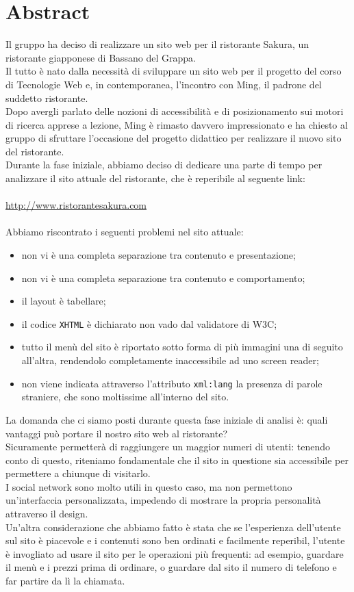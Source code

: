 \documentclass[../relazione.tex]{subfiles}
\begin{document}
\section{Abstract}
		Il gruppo ha deciso di realizzare un sito web per il ristorante Sakura, un ristorante giapponese di Bassano del Grappa.\\
		Il tutto è nato dalla necessità di sviluppare un sito web per il progetto del corso di Tecnologie Web e, in contemporanea, l'incontro con Ming, il padrone del suddetto ristorante.\\
		Dopo avergli parlato delle nozioni di accessibilità e di posizionamento sui motori di ricerca apprese a lezione, Ming è rimasto davvero impressionato e ha chiesto al gruppo di sfruttare l'occasione del progetto didattico per realizzare il nuovo sito del ristorante.\\
		Durante la fase iniziale, abbiamo deciso di dedicare una parte di tempo per analizzare il sito attuale del ristorante, che è reperibile al seguente link: \\\\\url{http://www.ristorantesakura.com}
		\\\\Abbiamo riscontrato i seguenti problemi nel sito attuale:
		\begin{itemize}
			\item non vi è una completa separazione tra contenuto e presentazione;
			\item non vi è una completa separazione tra contenuto e comportamento;
			\item il layout è tabellare;
			\item il codice \texttt{XHTML} è dichiarato non vado dal validatore di W3C;
			\item tutto il menù del sito è riportato sotto forma di più immagini una di seguito all'altra, rendendolo completamente inaccessibile ad uno screen reader;
			\item non viene indicata attraverso l'attributo \texttt{xml:lang} la presenza di parole straniere, che sono moltissime all'interno del sito.
		\end{itemize}
		La domanda che ci siamo posti durante questa fase iniziale di analisi è: quali vantaggi può portare il nostro sito web al ristorante?\\
		Sicuramente permetterà di raggiungere un maggior numeri di utenti: tenendo conto di questo, riteniamo fondamentale che il sito in questione sia accessibile per permettere a chiunque di visitarlo.\\
		I social network sono molto utili in questo caso, ma non permettono un'interfaccia personalizzata, impedendo di mostrare la propria personalità attraverso il design.\\
		Un'altra considerazione che abbiamo fatto è stata che se l'esperienza dell'utente sul sito è piacevole e i contenuti sono ben ordinati e facilmente reperibil, l'utente è invogliato ad usare il sito per le operazioni più frequenti: ad esempio, guardare il menù e i prezzi prima di ordinare, o guardare dal sito il numero di telefono e far partire da lì la chiamata.
\end{document}
